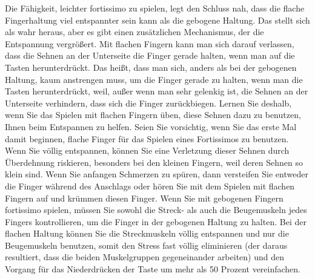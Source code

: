 Die Fähigkeit, leichter fortissimo zu spielen, legt den Schluss nah, dass die flache Fingerhaltung viel entspannter sein kann als die gebogene Haltung.
Das stellt sich als wahr heraus, aber es gibt einen zusätzlichen Mechanismus, der die Entspannung vergrößert.
Mit flachen Fingern kann man sich darauf verlassen, dass die Sehnen an der Unterseite die Finger gerade halten, wenn man auf die Tasten herunterdrückt.
Das heißt, dass man sich, anders als bei der gebogenen Haltung, kaum anstrengen muss, um die Finger gerade zu halten, wenn man die Tasten herunterdrückt, weil, außer wenn man sehr gelenkig ist, die Sehnen an der Unterseite verhindern, dass sich die Finger zurückbiegen.
Lernen Sie deshalb, wenn Sie das Spielen mit flachen Fingern üben, diese Sehnen dazu zu benutzen, Ihnen beim Entspannen zu helfen.
Seien Sie vorsichtig, wenn Sie das erste Mal damit beginnen, flache Finger für das Spielen eines Fortissimos zu benutzen.
Wenn Sie völlig entspannen, können Sie eine Verletzung dieser Sehnen durch Überdehnung riskieren, besonders bei den kleinen Fingern, weil deren Sehnen so klein sind.
Wenn Sie anfangen Schmerzen zu spüren, dann versteifen Sie entweder die Finger während des Anschlags oder hören Sie mit dem Spielen mit flachen Fingern auf und krümmen diesen Finger.
Wenn Sie mit gebogenen Fingern fortissimo spielen, müssen Sie sowohl die Streck- als auch die Beugemuskeln jedes Fingers kontrollieren, um die Finger in der gebogenen Haltung zu halten.
Bei der flachen Haltung können Sie die Streckmuskeln völlig entspannen und nur die Beugemuskeln benutzen, somit den Stress fast völlig eliminieren (der daraus resultiert, dass die beiden Muskelgruppen gegeneinander arbeiten) und den Vorgang für das Niederdrücken der Taste um mehr als 50 Prozent vereinfachen.

